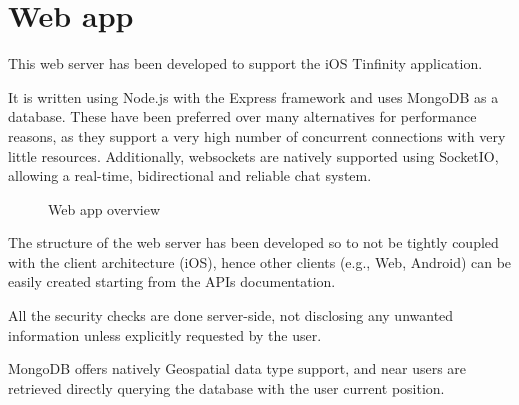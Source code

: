  
\section{Web app}
This web server has been developed to support the iOS Tinfinity application.

It is written using Node.js with the Express framework and uses MongoDB as a database. These have been preferred over many alternatives for performance reasons, as they support a very high number of concurrent connections with very little resources. Additionally, websockets are natively supported using SocketIO, allowing a real-time, bidirectional and reliable chat system.

\begin{figure}[H]
\caption{Web app overview}
\end{figure}

The structure of the web server has been developed so to not be tightly coupled with the client architecture (iOS), hence other clients (e.g., Web, Android) can be easily created starting from the APIs documentation.

All the security checks are done server-side, not disclosing any unwanted information unless explicitly requested by the user.

MongoDB offers natively Geospatial data type support, and near users are retrieved directly querying the database with the user current position.
